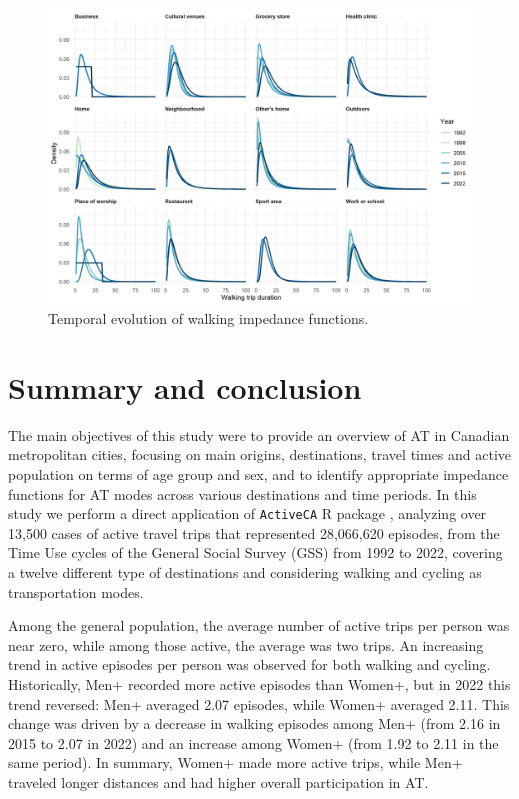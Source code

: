 \documentclass[preprint, 3p,
authoryear]{elsarticle} %
\begin{document}
\begin{figure}

{\centering \includegraphics[width=1\linewidth]{figures/walking_temporal_evolution} 

}

\caption{Temporal evolution of walking impedance functions.}\label{fig:walking-evolution-fig}
\end{figure}

\section{Summary and conclusion}\label{summary-and-conclusion}

The main objectives of this study were to provide an overview of AT in
Canadian metropolitan cities, focusing on main origins, destinations,
travel times and active population on terms of age group and sex, and to
identify appropriate impedance functions for AT modes across various
destinations and time periods. In this study we perform a direct
application of \texttt{ActiveCA} R package \citep{dossantos2025},
analyzing over 13,500 cases of active travel trips that represented
28,066,620 episodes, from the Time Use cycles of the General Social
Survey (GSS) from 1992 to 2022, covering a twelve different type of
destinations and considering walking and cycling as transportation
modes.

Among the general population, the average number of active trips per
person was near zero, while among those active, the average was two
trips. An increasing trend in active episodes per person was observed
for both walking and cycling. Historically, Men+ recorded more active
episodes than Women+, but in 2022 this trend reversed: Men+ averaged
2.07 episodes, while Women+ averaged 2.11. This change was driven by a
decrease in walking episodes among Men+ (from 2.16 in 2015 to 2.07 in
2022) and an increase among Women+ (from 1.92 to 2.11 in the same
period). In summary, Women+ made more active trips, while Men+ traveled
longer distances and had higher overall participation in AT.
\end{document}
